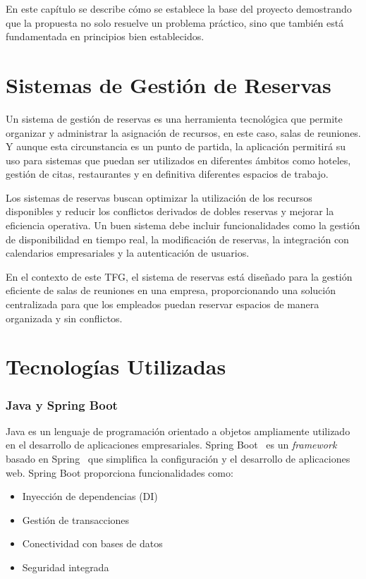 
En este capítulo se describe cómo se establece la base del proyecto demostrando que la propuesta no solo resuelve un problema práctico, sino que también está fundamentada en principios bien establecidos.

\section{Sistemas de Gestión de Reservas}

Un sistema de gestión de reservas es una herramienta tecnológica que permite organizar y administrar la asignación de recursos, en este caso, salas de reuniones. Y aunque esta circunstancia es un punto de partida, la aplicación permitirá su uso para sistemas que puedan ser utilizados en diferentes ámbitos como hoteles, gestión de citas, restaurantes y en definitiva diferentes espacios de trabajo.

Los sistemas de reservas buscan optimizar la utilización de los recursos disponibles y reducir los conflictos derivados de dobles reservas y mejorar la eficiencia operativa. Un buen sistema debe incluir funcionalidades como la gestión de disponibilidad en tiempo real, la modificación de reservas, la integración con calendarios empresariales y la autenticación de usuarios.

En el contexto de este TFG, el sistema de reservas está diseñado para la gestión eficiente de salas de reuniones en una empresa, proporcionando una solución centralizada para que los empleados puedan reservar espacios de manera organizada y sin conflictos.

\section{Tecnologías Utilizadas}
\subsubsection{Java y Spring Boot}
Java es un lenguaje de programación orientado a objetos ampliamente utilizado en el desarrollo de aplicaciones empresariales. Spring Boot~\cite{spring-boot} es un \emph{framework}~\cite{framework} basado en Spring~\cite{spring} que simplifica la configuración y el desarrollo de aplicaciones web.
Spring Boot proporciona funcionalidades como:
\begin{itemize}
\tightlist
\item
Inyección de dependencias (DI)
\item
Gestión de transacciones
\item
Conectividad con bases de datos
\item
Seguridad integrada
\end{itemize}

